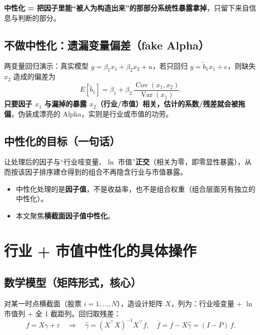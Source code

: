 \documentclass[UTF8,11pt]{ctexart}
\begin{document}
\textbf{中性化 = 把因子里能“被人为构造出来”的那部分系统性暴露拿掉}，只留下来自信息与判断的部分。

\subsection{不做中性化：遗漏变量偏差（fake Alpha）}
两变量回归演示：真实模型 $y=\beta_1 x_1+\beta_2 x_2+u$，若只回归 $y=\tilde b_1 x_1+e$，则缺失 $x_2$ 造成的偏差为
\begin{equation}
E[\tilde b_1] = \beta_1 + \beta_2\,\frac{\operatorname{Cov}(x_1,x_2)}{\operatorname{Var}(x_1)}.
\end{equation}
\textbf{只要因子 $x_1$ 与漏掉的暴露 $x_2$（行业/市值）相关，估计的系数/残差就会被拖偏}，伪装成漂亮的 Alpha，实则是行业或市值的功劳。

\subsection{中性化的目标（一句话）}
让处理后的因子与“行业哑变量、$\ln$ 市值”\textbf{正交}（相关为零，即零显性暴露），从而按该因子排序建仓得到的组合不再隐含行业与市值暴露。

\begin{itemize}[itemsep=2pt]
\item 中性化处理的是\textbf{因子值}，不是收益率，也不是组合权重（组合层面另有独立的中性化）。
\item 本文聚焦\textbf{横截面因子值中性化}。
\end{itemize}

\section{行业 + 市值中性化的具体操作}

\subsection{数学模型（矩阵形式，核心）}
对某一时点横截面（股票 $i=1,\dots,N$），造设计矩阵 $X$，列为：行业哑变量 + $\ln$市值列 + 全 1 截距列。回归取残差：
\begin{equation}
f = X\gamma + \varepsilon
\quad\Rightarrow\quad
\hat\gamma=(X^{\top}X)^{-1}X^{\top}f,\quad
\bar f = f-X\hat\gamma = (I-P)\,f.
\end{equation}
\end{document}
